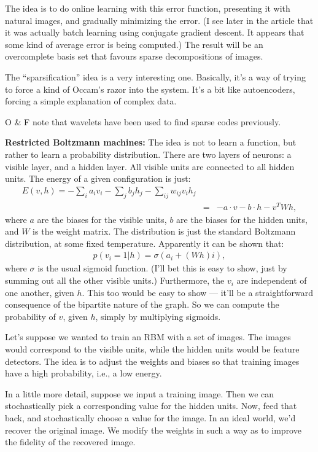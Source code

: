 \documentclass[12pt]{article}
\begin{document}
The idea is to do online learning with this error function, presenting
it with natural images, and gradually minimizing the error.  (I see
later in the article that it was actually batch learning using
conjugate gradient descent.  It appears that some kind of average
error is being computed.)  The result will be an overcomplete basis
set that favours sparse decompositions of images.

The ``sparsification'' idea is a very interesting one.  Basically,
it's a way of trying to force a kind of Occam's razor into the system.
It's a bit like autoencoders, forcing a simple explanation of complex
data.

O \& F note that wavelets have been used to find sparse codes
previously.

\textbf{Restricted Boltzmann machines:} The idea is not to learn a
function, but rather to learn a probability distribution.  There are
two layers of neurons: a visible layer, and a hidden layer.  All
visible units are connected to all hidden units.  The energy of a
given configuration is just:
\begin{eqnarray}
  E(v, h) = -\sum_i a_i v_i-\sum_j b_j h_j-\sum_{ij} w_{ij} v_i h_j \\
  & = & -a \cdot v-b\cdot h -v^T W h,
\end{eqnarray}
where $a$ are the biases for the visible units, $b$ are the biases for
the hidden units, and $W$ is the weight matrix.  The distribution is
just the standard Boltzmann distribution, at some fixed temperature.
Apparently it can be shown that:
\begin{eqnarray}
  p(v_i = 1 | h) = \sigma( a_i + (Wh)i),
\end{eqnarray}
where $\sigma$ is the usual sigmoid function.  (I'll bet this is easy
to show, just by summing out all the other visible units.)
Furthermore, the $v_i$ are independent of one another, given $h$.
This too would be easy to show --- it'll be a straightforward
consequence of the bipartite nature of the graph. So we can compute
the probability of $v$, given $h$, simply by multiplying sigmoids.

Let's suppose we wanted to train an RBM with a set of images.  The
images would correspond to the visible units, while the hidden units
would be feature detectors.  The idea is to adjust the weights and
biases so that training images have a high probability, i.e., a low
energy.  

In a little more detail, suppose we input a training image.  Then we
can stochastically pick a corresponding value for the hidden units.
Now, feed that back, and stochastically choose a value for the image.
In an ideal world, we'd recover the original image.  We modify the
weights in such a way as to improve the fidelity of the recovered
image.
\end{document}
